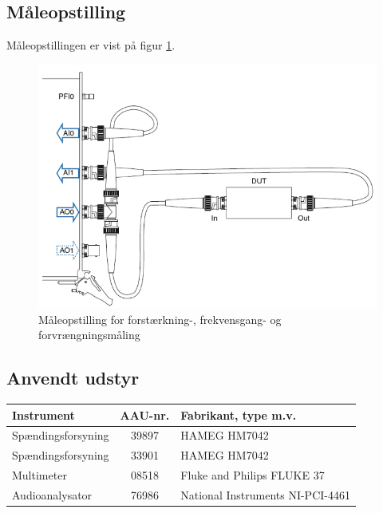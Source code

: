 \subsection*{Måleopstilling}
Måleopstillingen er vist på figur \ref{fig:indgangthd:maaleop-thd}.

\begin{figure}[h]
\centering
\includegraphics[scale=0.4]{maalerapporter/indgangsvaelger/maaleopstilling-thd-forforstaerker.png}
\caption{Måleopstilling for forstærkning-, frekvensgang- og forvrængningsmåling \cite{maaling-mm5}}
\label{fig:indgangthd:maaleop-thd}
\end{figure}


\subsection*{Anvendt udstyr}
\begin{table}[h]
\centering
\begin{tabular}{l|c|l}
\hline\hline
Instrument & AAU-nr. & Fabrikant, type m.v. \\
\hline\hline
Spændingsforsyning & 39897 & HAMEG HM7042 \\[4pt]
Spændingsforsyning & 33901 & HAMEG HM7042 \\[4pt]
Multimeter & 08518 & Fluke and Philips FLUKE 37 \\[4pt]
Audioanalysator & 76986 & National Instruments NI-PCI-4461 \\
\hline\hline
\end{tabular}
\label{tab:indgang:maaleudstyr_forforstaerker}
\end{table}

